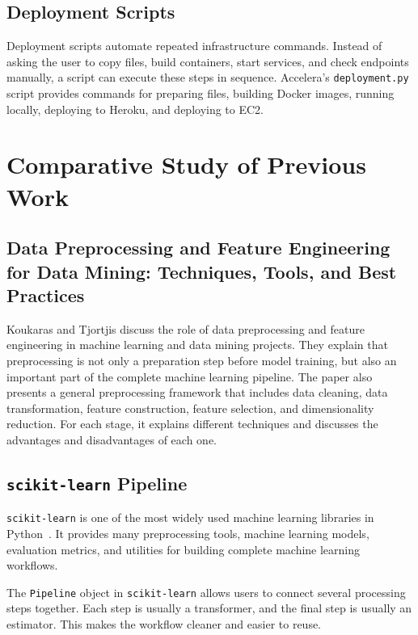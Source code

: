 \documentclass[12pt,a4paper]{report}
\newcommand{\modulepath}[1]{\texttt{#1}}
\begin{document}
\subsection{Deployment Scripts}
Deployment scripts automate repeated infrastructure commands. Instead of asking
the user to copy files, build containers, start services, and check endpoints
manually, a script can execute these steps in sequence. Accelera's
\modulepath{deployment.py} script provides commands for preparing files,
building Docker images, running locally, deploying to Heroku, and deploying to
EC2.

\newpage

\section{Comparative Study of Previous Work}
\mbox{}

\subsection{Data Preprocessing and Feature Engineering for Data Mining:
Techniques, Tools, and Best Practices ~\cite{paraskevas2025data}}
Koukaras and Tjortjis discuss the role of data preprocessing and feature
engineering in machine learning and data mining projects. They explain that
preprocessing is not only a preparation step before model training, but also an
important part of the complete machine learning pipeline. The paper also
presents a general preprocessing framework that includes data cleaning, data
transformation, feature construction, feature selection, and dimensionality
reduction. For each stage, it explains different techniques and discusses the
advantages and disadvantages of each one.


\subsection{\texttt{scikit-learn} Pipeline}

\texttt{scikit-learn} is one of the most widely used machine learning libraries
in Python~\cite{pedregosa2011scikit}. It provides many preprocessing tools,
machine learning models, evaluation metrics, and utilities for building complete
machine learning workflows.

The \texttt{Pipeline} object in \texttt{scikit-learn} allows users to connect
several processing steps together. Each step is usually a transformer, and the
final step is usually an estimator. This makes the workflow cleaner and easier
to reuse.
\end{document}
